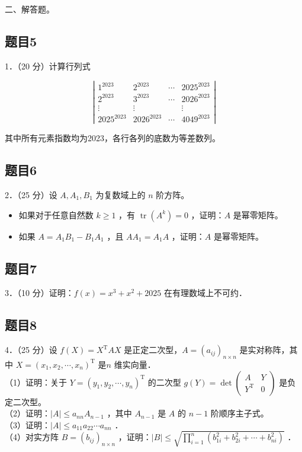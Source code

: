 \documentclass{article}
\begin{document}
二、解答题。\\

\subsection{题目5}
1．（20 分）计算行列式

\[
\left|\begin{array}{cccc}
1^{2023} & 2^{2023} & \cdots & 2025^{2023} \\
2^{2023} & 3^{2023} & \cdots & 2026^{2023} \\
\vdots & \vdots & & \vdots \\
2025^{2023} & 2026^{2023} & \cdots & 4049^{2023}
\end{array}\right|
\]

其中所有元素指数均为2023，各行各列的底数为等差数列。

\subsection{题目6}
2．（25 分）设 \(A, A_{1}, B_{1}\) 为复数域上的 \(n\) 阶方阵。

\begin{itemize}
  \item[（1）] 如果对于任意自然数 \(k \geq 1\) ，有 \(\operatorname{tr}\left(A^{k}\right)=0\) ，证明：\(A\) 是幂零矩阵。
  \item[（2）] 如果 \(A=A_{1} B_{1}-B_{1} A_{1}\) ，且 \(A A_{1}=A_{1} A\) ，证明：\(A\) 是幂零矩阵。
\end{itemize}

\subsection{题目7}
3．（10 分）证明：\(f(x)=x^{3}+x^{2}+2025\) 在有理数域上不可约．

\subsection{题目8}
4．（25 分）设 \(f(X)=X^{\mathrm{T}} A X\) 是正定二次型，\(A=\left(a_{i j}\right)_{n \times n}\) 是实对称阵，其中 \(X=\left(x_{1}, x_{2}, \cdots, x_{n}\right)^{\mathrm{T}}\) 是\(n\) 维实向量．\\
（1）证明：关于 \(Y=\left(y_{1}, y_{2}, \cdots, y_{n}\right)^{\mathrm{T}}\) 的二次型 \(g(Y)=\operatorname{det}\left(\begin{array}{cc}A & Y \\ Y^{\mathrm{T}} & 0\end{array}\right)\) 是负定二次型。\\
（2）证明：\(|A| \leq a_{n n} A_{n-1}\) ，其中 \(A_{n-1}\) 是 \(A\) 的 \(n-1\) 阶顺序主子式。\\
（3）证明：\(|A| \leq a_{11} a_{22} \cdots a_{n n}\) ．\\
（4）对实方阵 \(B=\left(b_{i j}\right)_{n \times n}\) ，证明：\(|B| \leq \sqrt{\prod_{i=1}^{n}\left(b_{1 i}^{2}+b_{2 i}^{2}+\cdots+b_{n i}^{2}\right)}\) ．
\end{document}
